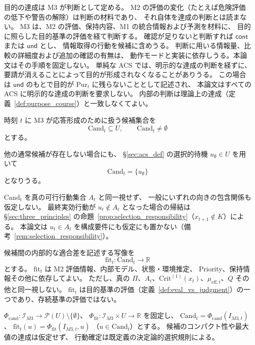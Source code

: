 \begin{remark}[目的の状態判断の読み]
\label{rem:purpose_status_reading}
目的の達成は M3 が判断として定める。
M2 の評価の変化（たとえば危険評価の低下や警告の解除）は判断の材料であり、
それ自体を達成の判断とは読まない。
M3 は、M2 の評価、保持内容、M1 の統合情報および予測を材料に、
目的に照らした目的基準の評価を経て判断する。
確認が足りないと判断すれば $\mathsf{cont}$ または $\mathsf{und}$ とし、
情報取得の行動を候補に含めうる。
判断に用いる情報量、比較の詳細度および追加の確認の有無は、
動作モードと実装に依存しうる。本論文はその手順を固定しない。
単純な ACS では、明示的な達成の判断を経ずに、
要請が消えることによって目的が形成されなくなることがありうる。
この場合は $\mathsf{und}$ のもとで目的が $\mathrm{Pur}_t$ に残らないこととして記述され、
本論文はすべての ACS に明示的な達成の判断を要求しない。
内部の判断は理論上の達成（定義~\ref{def:purpose_course}）と一致しなくてよい。
\end{remark}

\begin{definition}
\label{def:m3_candidate_set}
時刻 $t$ に M3 が応答形成のために扱う候補集合を
\[
  \mathrm{Cand}_t\subseteq U,
  \qquad
  \mathrm{Cand}_t\neq\emptyset
\]
とする。

他の通常候補が存在しない場合にも、
\S\ref{sec:acs_def} の選択的待機 $u_\emptyset\in U$ を用いて
\[
  \mathrm{Cand}_t=\{u_\emptyset\}
\]
となりうる。

$\mathrm{Cand}_t$ を真の可行行動集合 $A_t$ と同一視せず、
一般にいずれの向きの包含関係も仮定しない。
最終実効行動が $u_t\notin A_t$ となった場合の帰結は
\S\ref{sec:three_principles} の命題~\ref{prop:selection_responsibility}（$x_{t+1}\notin K$）による。
本論文は $u_t\in A_t$ を構成要件にも仮定にも置かない（備考~\ref{rem:selection_responsibility}）。
\end{definition}

\begin{definition}
\label{def:m3_fit}
候補間の内部的な適合差を記述する写像を
\[
  \mathrm{fit}_t:
  \mathrm{Cand}_t\to\mathbb R
\]
とする。
$\mathrm{fit}_t$ は M2 評価情報、内部モデル、状態・環境推定、
Priority、保持情報その他に依存してよい。
ただし、真の $\Pi$、$A_t$、$\mathrm{Crit}^{(1)}(x_t)$、$\mu_{\mathrm{eff},t}$、$Q$ その他と同一視しない。
$\mathrm{fit}_t$ は目的基準の評価（定義~\ref{def:eval_vs_judgment}）の一つであり、存続基準の評価ではない。
\end{definition}
\begin{definition}
\label{def:s4_candidate_sources}
$\Phi_{\mathrm{cand}}:\mathcal I_{M3}\to\mathcal P(U)\setminus\{\emptyset\}$、
$\Phi_{\mathrm{fit}}:\mathcal I_{M3}\times U\to\mathbb R$ を固定し、
$\mathrm{Cand}_t=\Phi_{\mathrm{cand}}(I_{M3,t})$、
$\mathrm{fit}_t(u)=\Phi_{\mathrm{fit}}(I_{M3,t},u)$
（$u\in\mathrm{Cand}_t$）とする。
候補のコンパクト性や最大値の達成は仮定せず、
行動確定は既定義の決定論的選択規則による。
\end{definition}


